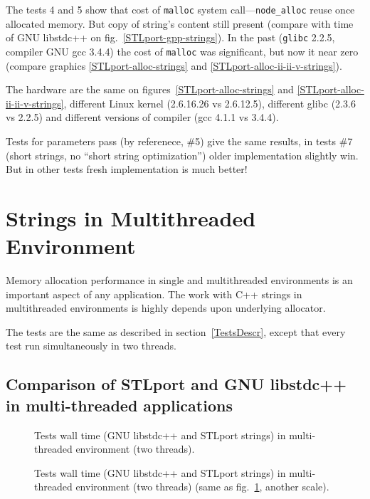\documentclass[a4paper]{article}
\providecommand{\STLport}{{\fontfamily{cmss}\selectfont STLport}}
\providecommand{\libstd}{{\fontfamily{cmtt}\selectfont GNU \mbox{libstdc++}}}
\newcommand{\CPP}{\mbox{{C}{+}{+}}}
\begin{document}
The tests 4 and 5 show
that cost of \verb|malloc| system call---\verb|node_alloc| reuse once
allocated memory. But copy of string's content still present (compare with time of
\libstd{} on fig.~\ref{STLport-gpp-strings}). In the past (\verb|glibc| 2{.}2{.}5,
compiler GNU gcc 3{.}4{.}4)
the cost of \verb|malloc| was significant, but now it near zero (compare graphics
\ref{STLport-alloc-strings} and \ref{STLport-alloc-ii-ii-v-strings}).

The hardware are the same on figures~\ref{STLport-alloc-strings}
and \ref{STLport-alloc-ii-ii-v-strings}, different Linux kernel
(2{.}6{.}16{.}26 vs 2{.}6{.}12{.}5), different
glibc (2{.}3{.}6 vs 2{.}2{.}5) and different versions of compiler (gcc 4{.}1{.}1 vs 3{.}4{.}4).

Tests for parameters pass (by referenece, \#5) give the same results, in tests
\#7 (short strings, no ``short string optimization'') older implementation slightly win.
But in other tests fresh implementation is much better!

\section{Strings in Multithreaded Environment}

Memory allocation performance in single and multithreaded environments
is an important aspect of any application. The work with \CPP{}
strings in multithreaded environments is highly depends upon
underlying allocator.

The tests are the same as described in section~\ref{TestsDescr},
except that every test run simultaneously in two threads.


\subsection{Comparison of \STLport{} and \libstd{} in multi-threaded applications}

\begin{figure}
  \begin{center}
    
  \end{center}
  \caption{Tests wall time (\libstd{} and \STLport{}
           strings) in multi-threaded environment (two threads).
           \label{STLport-gpp-MT-strings}}
\end{figure}

\begin{figure}
  \begin{center}
    
  \end{center}
  \caption{Tests wall time (\libstd{} and \STLport{}
           strings) in multi-threaded environment (two threads) (same as fig.~\ref{STLport-gpp-MT-strings}, another scale).
           \label{STLport-gpp-MT-strings2}}
\end{figure}
\end{document}
